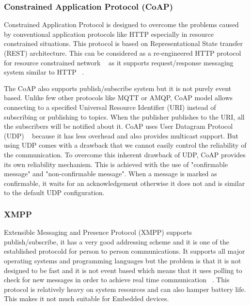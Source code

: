 \documentclass[conference]{IEEEtran}
\begin{document}
\subsubsection{Constrained Application Protocol (CoAP)}
Constrained Application Protocol is designed to overcome the problems caused by conventional application protocols like HTTP especially in resource constrained situations. This protocol is based on Representational State transfer (REST) architecture. This can be considered as a re-engineered HTTP protocol for resource constrained network ~\cite{coap1} as it supports request/response messaging system similar to HTTP~\cite{coap2} .

The CoAP also supports publish/subscribe system but it is not purely event based. Unlike few other protocols like MQTT or AMQP, CoAP model allows connecting to a specified Universal Resource Identifier (URI) instead of subscribing or publishing to topics. When the publisher publishes to the URI, all the subscribers will be notified about it. CoAP uses User Datagram Protocol (UDP) ~\cite{coap-web} because it has less overhead and also provides multicast support. But using UDP comes with a drawback that we cannot easily control the reliability of the communication. To overcome this inherent drawback of UDP, CoAP provides its own reliability mechanism. This is achieved with the use of "confirmable message" and "non-confirmable message". When a message is marked as confirmable, it waits for an acknowledgement otherwise it does not and is similar to the default UDP configuration. 

\subsubsection{XMPP}
Extensible Messaging and Presence Protocol (XMPP) supports publish/subscribe, it has a very good addressing scheme and it is one of the established protocold for person to person communications. It supports all major operating systems and programming languages but the problem is that it is not designed to be fast and it is not event based which means that it uses polling to check for new messages in order to achieve real time communication ~\cite{xmpp-polling}. This protocol is relatively heavy on system resources and can also hamper battery life. This makes it not much suitable for Embedded devices.
\end{document}
